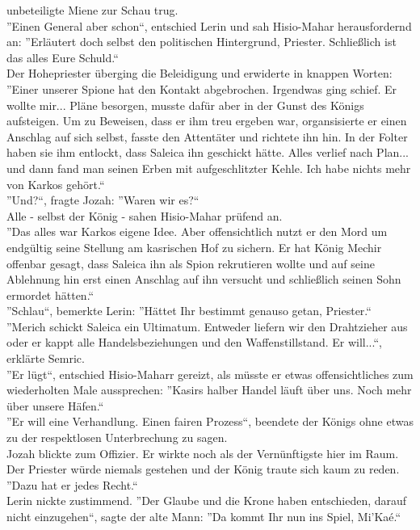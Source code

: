 unbeteiligte Miene zur Schau trug.\\
''Einen General aber schon``, entschied Lerin und sah Hisio-Mahar herausfordernd an: ''Erläutert 
doch selbst den politischen Hintergrund, Priester. Schließlich ist das alles Eure Schuld.``\\
Der Hohepriester überging die Beleidigung und erwiderte in knappen Worten: ''Einer unserer Spione 
hat den Kontakt abgebrochen. Irgendwas ging schief. Er wollte mir... Pläne besorgen, musste dafür 
aber in der Gunst des Königs aufsteigen. Um zu Beweisen, dass er ihm treu ergeben war, 
organsisierte er einen Anschlag auf sich selbst, fasste den Attentäter und richtete ihn hin. In der 
Folter haben sie ihm entlockt, dass Saleica ihn geschickt hätte. Alles verlief nach Plan... und 
dann fand man seinen Erben mit aufgeschlitzter Kehle. Ich habe nichts mehr von Karkos gehört.``\\
''Und?``, fragte Jozah: ''Waren wir es?``\\
Alle - selbst der König - sahen Hisio-Mahar prüfend an.\\
''Das alles war Karkos eigene Idee. Aber offensichtlich nutzt er den Mord um endgültig seine 
Stellung am kasrischen Hof zu sichern. Er hat König Mechir offenbar gesagt, dass Saleica ihn als 
Spion rekrutieren wollte und auf seine Ablehnung hin erst einen Anschlag auf ihn versucht und 
schließlich seinen Sohn ermordet hätten.``\\
''Schlau``, bemerkte Lerin: ''Hättet Ihr bestimmt genauso getan, Priester.``\\
''Merich schickt Saleica ein Ultimatum. Entweder liefern wir den Drahtzieher aus oder er kappt alle 
Handelsbeziehungen und den Waffenstillstand. Er will...``, erklärte Semric.\\
''Er lügt``, entschied Hisio-Maharr gereizt, als müsste er etwas offensichtliches zum wiederholten 
Male aussprechen: ''Kasirs halber Handel läuft über uns. Noch mehr über unsere Häfen.``\\
''Er will eine Verhandlung. Einen fairen Prozess``, beendete der Königs ohne etwas zu der 
respektlosen Unterbrechung zu sagen.\\
Jozah blickte zum Offizier. Er wirkte noch als der Vernünftigste hier im Raum. Der Priester würde 
niemals gestehen und der König traute sich kaum zu reden. ''Dazu hat er jedes Recht.``\\
Lerin nickte zustimmend. ''Der Glaube und die Krone haben entschieden, darauf nicht einzugehen``, 
sagte der alte Mann: ''Da kommt Ihr nun ins Spiel, Mi'Kaé.``\\
